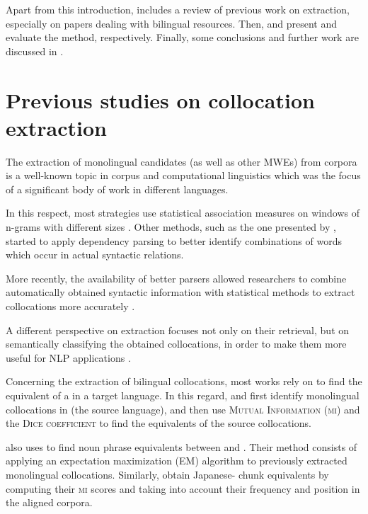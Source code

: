 \documentclass[output=paper
,modfonts
,nonflat]{langsci/langscibook}
\begin{document}
Apart from this introduction,  includes a review of previous work on 
extraction, especially on papers dealing with bilingual resources. Then, 
and  present and evaluate the method, respectively. Finally, some conclusions
and further work are discussed in .


%
\section{Previous studies on collocation extraction}
\label{garcia:sec:rw}

The extraction of monolingual  candidates (as well as other MWEs)
from corpora is a well-known topic in corpus and computational linguistics which was the focus of a significant body of work in different languages.

In this respect, most strategies use statistical association measures on windows of
n-grams with different sizes \citep{church1990, smadja1993}. Other methods, such as the
one presented by \citet{lin1999}, started to apply dependency parsing to better identify
combinations of words which occur in actual syntactic relations.

More recently, the availability of better parsers allowed researchers to combine automatically
obtained syntactic information with statistical methods to extract collocations more accurately \citep{evert2008,seretan2011syntax}.

A different perspective on  extraction focuses not only on their retrieval, but on
semantically classifying the obtained collocations, in order to make them more useful for NLP
applications \citep{wanner2006,wanner2016}.

Concerning the extraction of bilingual collocations, most works rely on  to find the
equivalent of a  in a target language. In this regard, \citet{smadja1992} and \citet{smadja1996}
first identify monolingual collocations in  (the source language), and then use \textsc{Mutual
  Information} (\textsc{mi}) and the \textsc{Dice coefficient} to find the  equivalents of the source
collocations. 

\citet{kupiec1993} also uses  to find noun phrase equivalents between 
and . Their method consists of applying an expectation maximization (EM) algorithm to previously
extracted monolingual collocations.
Similarly, \citet{haruno1996} obtain Japanese- chunk equivalents by computing
their \textsc{mi} scores and taking into account their frequency and position in the aligned corpora.
\end{document}
